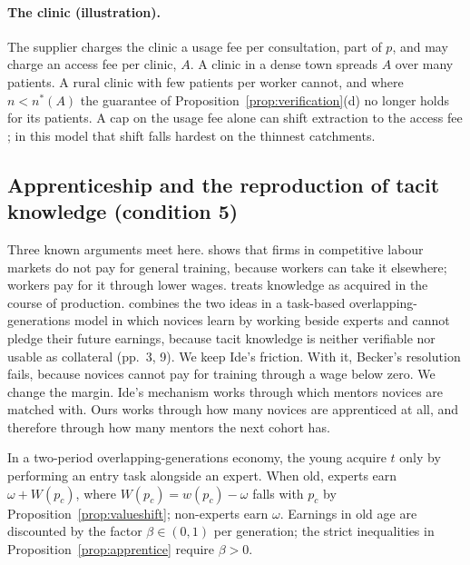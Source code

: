 \documentclass[12pt]{article}
\theoremstyle{remark}
\begin{document}
\paragraph{The clinic (illustration).} The supplier charges the clinic a usage fee per consultation, part of $p$, and may charge an access fee per clinic, $A$. A clinic in a dense town spreads $A$ over many patients. A rural clinic with few patients per worker cannot, and where $n<n^*(A)$ the guarantee of Proposition~\ref{prop:verification}(d) no longer holds for its patients. A cap on the usage fee alone can shift extraction to the access fee \citep[p.~110]{athey2026competition}; in this model that shift falls hardest on the thinnest catchments.

\subsection{Apprenticeship and the reproduction of tacit knowledge (condition 5)}\label{sec:apprentice}

Three known arguments meet here. \citet{becker1962investment} shows that firms in competitive labour markets do not pay for general training, because workers can take it elsewhere; workers pay for it through lower wages. \citet{arrow1962learning} treats knowledge as acquired in the course of production. \citet{ide2025automation} combines the two ideas in a task-based overlapping-generations model in which novices learn by working beside experts and cannot pledge their future earnings, because tacit knowledge is neither verifiable nor usable as collateral (pp.~3, 9). We keep Ide's friction. With it, Becker's resolution fails, because novices cannot pay for training through a wage below zero. We change the margin. Ide's mechanism works through which mentors novices are matched with. Ours works through how many novices are apprenticed at all, and therefore through how many mentors the next cohort has.

In a two-period overlapping-generations economy, the young acquire $t$ only by performing an entry task alongside an expert. When old, experts earn $\omega+W(p_c)$, where $W(p_c)=w(p_c)-\omega$ falls with $p_c$ by Proposition~\ref{prop:valueshift}; non-experts earn $\omega$. Earnings in old age are discounted by the factor $\beta\in(0,1)$ per generation; the strict inequalities in Proposition~\ref{prop:apprentice} require $\beta>0$.
\end{document}
